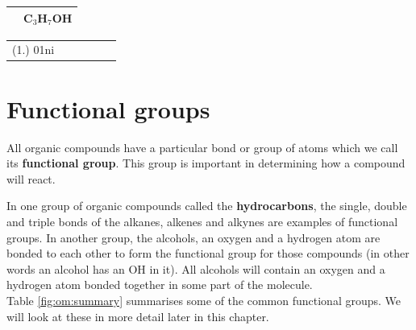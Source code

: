 {\begin{center}
\begin{tabular}{|c|c|}
& 

C$_{3}$H$_{7}$OH \\\hline

\end{tabular}
\end{center}

\vspace{-0.5cm}

\practiceinfo

\vspace{-0.5cm}

\begin{tabular}[h]{cccccc}
(1.)	01ni	&
\end{tabular}
}


\section{Functional groups}
\label{sec:organic:functional}

All organic compounds have a particular bond or group of atoms which we call its \textbf{functional group}. This group is important in determining how a compound will react. 


In one group of organic compounds called the \textbf{hydrocarbons}, the single, double and triple bonds of the alkanes, alkenes and alkynes are examples of functional groups. In another group, the alcohols, an oxygen and a hydrogen atom   are bonded to each other to form the functional group for those compounds (in other words an alcohol has an OH in it). All alcohols will contain an oxygen and a hydrogen atom bonded together in some part of the molecule. \\

Table \ref{fig:om:summary} summarises some of the common functional groups. We will look at these in more detail later in this chapter.

\newpage

